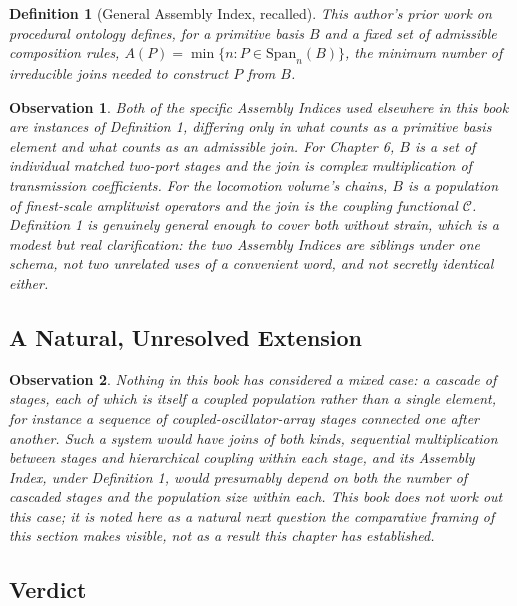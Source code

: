 \documentclass[12pt]{article}
\newtheorem{definition}{Definition}
\newtheorem{observation}{Observation}
\begin{document}
\begin{definition}[General Assembly Index, recalled]
This author's prior work on procedural ontology defines, for a primitive basis $B$ and a fixed set of admissible composition rules, $A(P) = \min\{n : P \in \text{Span}_n(B)\}$, the minimum number of irreducible joins needed to construct $P$ from $B$.
\end{definition}

\begin{observation}
Both of the specific Assembly Indices used elsewhere in this book are instances of Definition 1, differing only in what counts as a primitive basis element and what counts as an admissible join. For Chapter 6, $B$ is a set of individual matched two-port stages and the join is complex multiplication of transmission coefficients. For the locomotion volume's chains, $B$ is a population of finest-scale amplitwist operators and the join is the coupling functional $\mathcal{C}$. Definition 1 is genuinely general enough to cover both without strain, which is a modest but real clarification: the two Assembly Indices are siblings under one schema, not two unrelated uses of a convenient word, and not secretly identical either.
\end{observation}

\subsection{A Natural, Unresolved Extension}

\begin{observation}
Nothing in this book has considered a mixed case: a cascade of stages, each of which is itself a coupled population rather than a single element, for instance a sequence of coupled-oscillator-array stages connected one after another. Such a system would have joins of both kinds, sequential multiplication between stages and hierarchical coupling within each stage, and its Assembly Index, under Definition 1, would presumably depend on both the number of cascaded stages and the population size within each. This book does not work out this case; it is noted here as a natural next question the comparative framing of this section makes visible, not as a result this chapter has established.
\end{observation}

\subsection{Verdict}
\end{document}
